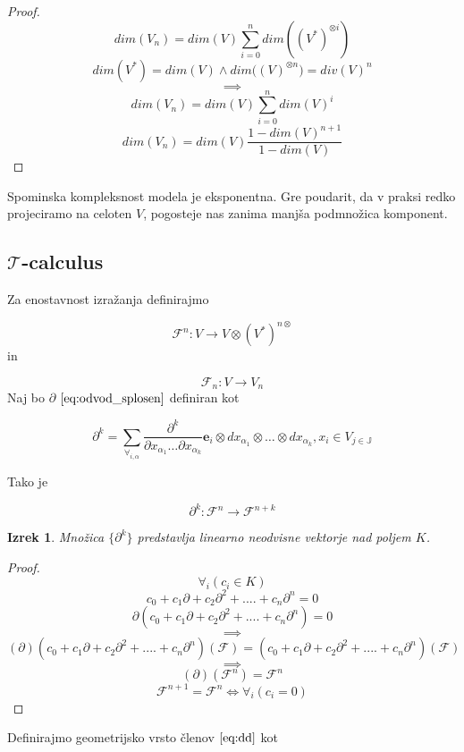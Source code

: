 \documentclass{article}
\newcommand{\JJ}{\mathbb{J}}
\newcommand{\T}{\mathcal{T}}
\newcommand{\e}{\mathbf{e}}
\newcommand{\F}{\mathcal{F}}
\newcommand{\D}{\partial}
\newtheorem{izrek}{Izrek}[section]
\begin{document}
\begin{proof}
	$$dim(V_n)=dim(V)\sum\limits_{i=0}^{n}dim((V^*)^{\otimes i})$$
	$$dim(V^*)=dim(V)\land dim\Big((V)^{\otimes n}\Big)=div(V)^n$$
	$$\implies$$
	$$dim(V_n)=dim(V)\sum\limits_{i=0}^{n}dim(V)^{i}$$
	$$dim(V_n)=dim(V)\frac{1-dim(V)^{n+1}}{1-dim(V)}$$
\end{proof}

Spominska kompleksnost modela je eksponentna. Gre poudarit, da v praksi redko projeciramo na celoten $V$, pogosteje nas zanima manjša podmnožica komponent.

\subsection{$\T$-calculus}

Za enostavnost izražanja definirajmo
 
 \begin{equation}\label{eq:F^n}
 	\F^n:V\to V\otimes(V^*)^{n\otimes}
 \end{equation}
 in
 
 \begin{equation}\label{eq:F_n}
 	\F_n:V\to V_n
 \end{equation}
Naj bo $\partial$ $\eqref{eq:odvod_splosen}$ definiran kot

\begin{equation}\label{eq:dd}
	\partial^k=\sum_{\forall_{i,\alpha}}\frac{\partial^k}{\partial
	    x_{\alpha_1}\ldots \partial x_{\alpha_k}}\e_i\otimes
	  dx_{\alpha_1}\otimes\ldots \otimes dx_{\alpha_k} , x_i\in V_{j\in\JJ}
\end{equation}

Tako je
 
 \begin{equation}
 \D^k:\F^n\to\F^{n+k}
 \end{equation}
 
 \begin{izrek}\label{izr:linearnaNeodvisnost}
  Množica $\{\partial^k\}$ predstavlja linearno neodvisne vektorje nad poljem $K$.
 \end{izrek}
 
 \begin{proof} 
 $$\forall_i(c_i\in K)$$
	  $$c_0+c_1\D+c_2\D^2+....+c_n\D^n=0$$
	$$\D(c_0+c_1\D+c_2\D^2+....+c_n\D^n)=0$$
	$$\implies$$
	$$(\D)(c_0+c_1\D+c_2\D^2+....+c_n\D^n)(\F)=(c_0+c_1\D+c_2\D^2+....+c_n\D^n)(\F)$$
	$$\implies$$
	$$(\D)(\F^n)=\F^n$$
	$$\F^{n+1}=\F^n\iff\forall_i(c_i=0)$$
	
 \end{proof}
 Definirajmo geometrijsko vrsto členov $\eqref{eq:dd}$ kot
 
\end{document}
